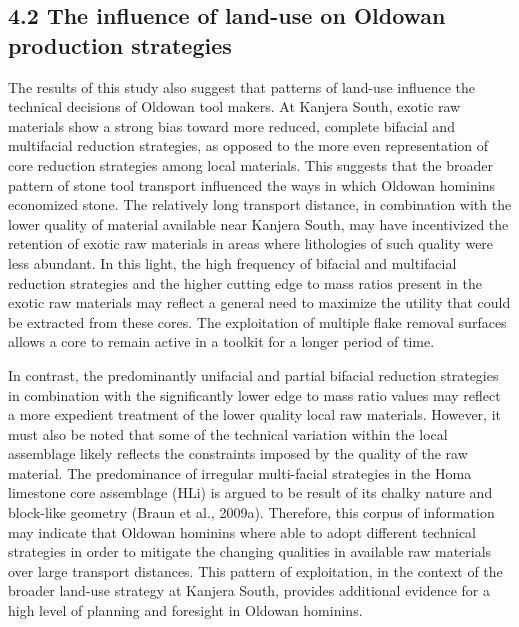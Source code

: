 \documentclass[]{elsarticle} %
\begin{document}
\hypertarget{the-influence-of-land-use-on-oldowan-production-strategies}{%
\subsection{4.2 The influence of land-use on Oldowan production
strategies}\label{the-influence-of-land-use-on-oldowan-production-strategies}}

The results of this study also suggest that patterns of land-use
influence the technical decisions of Oldowan tool makers. At Kanjera
South, exotic raw materials show a strong bias toward more reduced,
complete bifacial and multifacial reduction strategies, as opposed to
the more even representation of core reduction strategies among local
materials. This suggests that the broader pattern of stone tool
transport influenced the ways in which Oldowan hominins economized
stone. The relatively long transport distance, in combination with the
lower quality of material available near Kanjera South, may have
incentivized the retention of exotic raw materials in areas where
lithologies of such quality were less abundant. In this light, the high
frequency of bifacial and multifacial reduction strategies and the
higher cutting edge to mass ratios present in the exotic raw materials
may reflect a general need to maximize the utility that could be
extracted from these cores. The exploitation of multiple flake removal
surfaces allows a core to remain active in a toolkit for a longer period
of time.

In contrast, the predominantly unifacial and partial bifacial reduction
strategies in combination with the significantly lower edge to mass
ratio values may reflect a more expedient treatment of the lower quality
local raw materials. However, it must also be noted that some of the
technical variation within the local assemblage likely reflects the
constraints imposed by the quality of the raw material. The predominance
of irregular multi-facial strategies in the Homa limestone core
assemblage (HLi) is argued to be result of its chalky nature and
block-like geometry (Braun et al., 2009a). Therefore, this corpus of
information may indicate that Oldowan hominins where able to adopt
different technical strategies in order to mitigate the changing
qualities in available raw materials over large transport distances.
This pattern of exploitation, in the context of the broader land-use
strategy at Kanjera South, provides additional evidence for a high level
of planning and foresight in Oldowan hominins.
\end{document}
